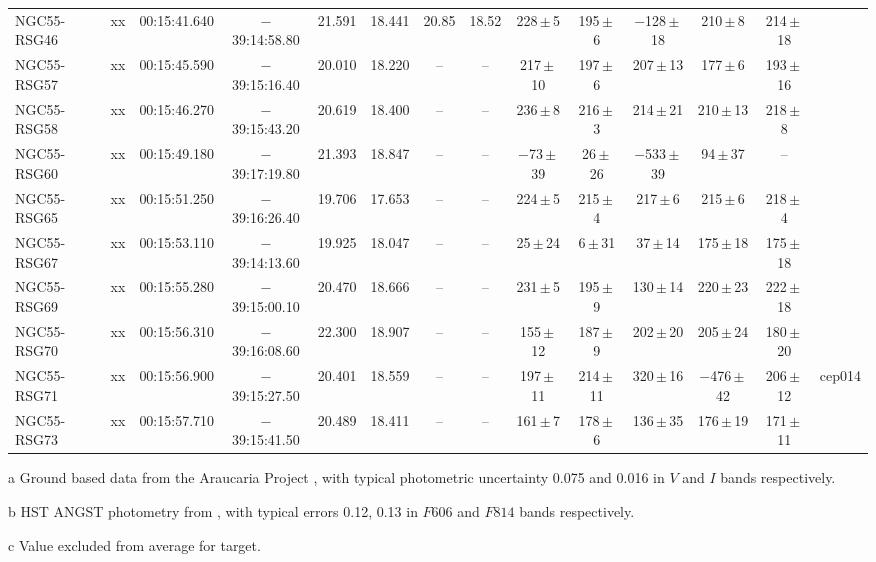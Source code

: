 \begin{table}
\begin{threeparttable}
\begin{tabular}{lrcccccccccccl}
NGC55-RSG46 & xx & 00:15:41.640 & $-$39:14:58.80& 21.591 & 18.441 &20.85 & 18.52 &   228\,$\pm$\,5  &  195\,$\pm$\,6   &  $-$128\,$\pm$\,18\tnote{c} &   210\,$\pm$\,8     & 214\,$\pm$\,18 & \\
NGC55-RSG57 & xx & 00:15:45.590 & $-$39:15:16.40& 20.010 & 18.220 & --   & --    &   217\,$\pm$\,10 &  197\,$\pm$\,6   &     207\,$\pm$\,13 &   177\,$\pm$\,6              & 193\,$\pm$\,16 & \\
NGC55-RSG58 & xx & 00:15:46.270 & $-$39:15:43.20& 20.619 & 18.400 & --   & --    &   236\,$\pm$\,8  &  216\,$\pm$\,3   &     214\,$\pm$\,21 &   210\,$\pm$\,13             & 218\,$\pm$\,8  & \\
NGC55-RSG60 & xx & 00:15:49.180 & $-$39:17:19.80& 21.393 & 18.847 & --   & --    & $-$73\,$\pm$\,39 &   26\,$\pm$\,26  &  $-$533\,$\pm$\,39 &    94\,$\pm$\,37             & --             & \\
NGC55-RSG65 & xx & 00:15:51.250 & $-$39:16:26.40& 19.706 & 17.653 & --   & --    &   224\,$\pm$\,5  &  215\,$\pm$\,4   &     217\,$\pm$\,6  &   215\,$\pm$\,6              & 218\,$\pm$\,4  & \\
NGC55-RSG67 & xx & 00:15:53.110 & $-$39:14:13.60& 19.925 & 18.047 & --   & --    &25\,$\pm$\,24\tnote{c} & 6\,$\pm$\,31\tnote{c}&37\,$\pm$\,14\tnote{c} &175\,$\pm$\,18    & 175\,$\pm$\,18 & \\
NGC55-RSG69 & xx & 00:15:55.280 & $-$39:15:00.10& 20.470 & 18.666 & --   & --    &   231\,$\pm$\,5  &  195\,$\pm$\,9   &130\,$\pm$\,14\tnote{c}&220\,$\pm$\,23             & 222\,$\pm$\,18 & \\
NGC55-RSG70 & xx & 00:15:56.310 & $-$39:16:08.60& 22.300 & 18.907 & --   & --    &   155\,$\pm$\,12 &  187\,$\pm$\,9   &     202\,$\pm$\,20 &   205\,$\pm$\,24             & 180\,$\pm$\,20 & \\
NGC55-RSG71 & xx & 00:15:56.900 & $-$39:15:27.50& 20.401 & 18.559 & --   & --    &   197\,$\pm$\,11 &  214\,$\pm$\,11  &320\,$\pm$\,16\tnote{c}&$-$476\,$\pm$\,42\tnote{c} & 206\,$\pm$\,12 & cep014\\
NGC55-RSG73 & xx & 00:15:57.710 & $-$39:15:41.50& 20.489 & 18.411 & --   & --    &   161\,$\pm$\,7  &  178\,$\pm$\,6   &     136\,$\pm$\,35 &   176\,$\pm$\,19             & 171\,$\pm$\,11 & \\

\hline
\end{tabular}
\begin{tablenotes}
  \item [a] Ground based data from the Araucaria Project
  \protect\cite{2006AJ....132.2556P}, with typical photometric uncertainty 0.075 and 0.016 in $V$ and $I$ bands respectively.
  \item [b] HST ANGST photometry from
  \protect\cite{2009ApJS..183...67D}, with typical errors 0.12, 0.13 in $F606$ and $F814$ bands respectively.
  \item [c] Value excluded from average for target.
\end{tablenotes}
\end{threeparttable}
\end{table}

